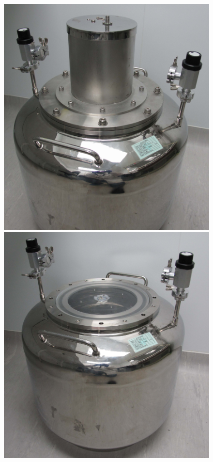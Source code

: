 \begin{figure}[h!]
    \centering
    \includegraphics[scale=0.3]{Chapter_4/Figures/electrostatic_detector_1.png}
    \includegraphics[scale=0.3]{Chapter_4/Figures/electrostatic_detector_2.png}

\end{figure}
